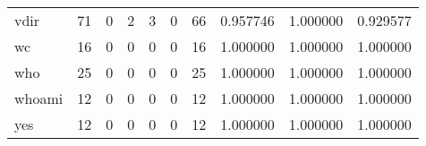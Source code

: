 \begin{tabular}{lrrrrrrrrr}
vdir      &                                      71 &                                                  0 &                                                  2 &                                                  3 &                                                  0 &                                                 66 &                                           0.957746 &                               1.000000 &                             0.929577 \\
wc        &                                      16 &                                                  0 &                                                  0 &                                                  0 &                                                  0 &                                                 16 &                                           1.000000 &                               1.000000 &                             1.000000 \\
who       &                                      25 &                                                  0 &                                                  0 &                                                  0 &                                                  0 &                                                 25 &                                           1.000000 &                               1.000000 &                             1.000000 \\
whoami    &                                      12 &                                                  0 &                                                  0 &                                                  0 &                                                  0 &                                                 12 &                                           1.000000 &                               1.000000 &                             1.000000 \\
yes       &                                      12 &                                                  0 &                                                  0 &                                                  0 &                                                  0 &                                                 12 &                                           1.000000 &                               1.000000 &                             1.000000 \\
\bottomrule
\end{tabular}
